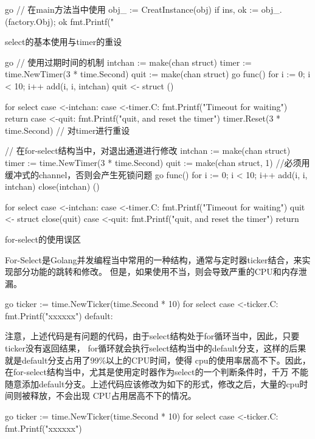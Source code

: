 \begin{outline}[enumerate]
\begin{code-block}{go}
// 在main方法当中使用
obj_ := CreatInstance(obj)
if ins, ok := obj_.(factory.Obj); ok {
    fmt.Printf("%
}
\end{code-block}

  \1 select的基本使用与timer的重设

\begin{code-block}{go}
// 使用过期时间的机制
intchan := make(chan struct{})
timer := time.NewTimer(3 * time.Second)
quit := make(chan struct{})
go func() {
    for i := 0; i < 10; i++ {
    add(i, i, intchan)
    }
    quit <- struct{}{}
}()

for {
    select {
    case <-intchan:
    case <-timer.C:
        fmt.Printf("Timeout for waiting\n")
        return
    case <-quit:
        fmt.Printf("quit, and reset the timer\n")
        timer.Reset(3 * time.Second) // 对timer进行重设
    }
}

// 在for-select结构当中，对退出通道进行修改
intchan := make(chan struct{})
timer := time.NewTimer(3 * time.Second)
quit := make(chan struct{}, 1) //必须用缓冲式的channel，否则会产生死锁问题
go func() {
    for i := 0; i < 10; i++ {
        add(i, i, intchan)
    }
    close(intchan)
}()

for {
    select {
    case <-intchan:
    case <-timer.C:
        fmt.Printf("Timeout for waiting\n")
        quit <- struct{}{}
        close(quit)
    case <-quit:
        fmt.Printf("quit, and reset the timer\n")
        return
    }
}
\end{code-block}


  \1 for-select的使用误区

  For-Select是Golang并发编程当中常用的一种结构，通常与定时器ticker结合，来实现部分功能的跳转和修改。
  但是，如果使用不当，则会导致严重的CPU和内存泄漏。
\begin{code-block}{go}
ticker := time.NewTicker(time.Second * 10)
for {
    select {
    case <-ticker.C:
        fmt.Printf("xxxxxx\n")
    default:
    }
}
\end{code-block}

注意，上述代码是有问题的代码，由于select结构处于for循环当中，因此，只要ticker没有返回结果，
for循环就会执行select结构当中的default分支，这样的后果就是default分支占用了99\%以上的CPU时间，使得
cpu的使用率居高不下。因此，在for-select结构当中，尤其是使用定时器作为select的一个判断条件时，千万
不能随意添加default分支。上述代码应该修改为如下的形式，修改之后，大量的cpu时间则被释放，不会出现
CPU占用居高不下的情况。

\begin{code-block}{go}
ticker := time.NewTicker(time.Second * 10)
for {
    select {
    case <-ticker.C:
        fmt.Printf("xxxxxx\n")
    }
}
\end{code-block}


\end{outline}

